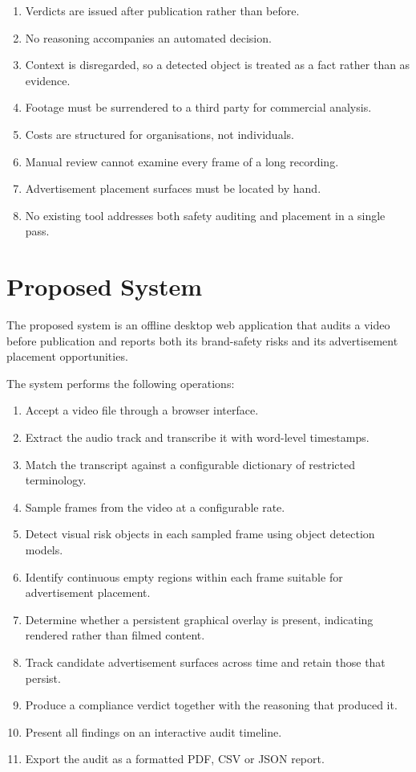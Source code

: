 \documentclass[12pt,a4paper,twoside]{report}
\begin{document}
\begin{enumerate}
\item Verdicts are issued after publication rather than before.
\item No reasoning accompanies an automated decision.
\item Context is disregarded, so a detected object is treated as a fact rather than as evidence.
\item Footage must be surrendered to a third party for commercial analysis.
\item Costs are structured for organisations, not individuals.
\item Manual review cannot examine every frame of a long recording.
\item Advertisement placement surfaces must be located by hand.
\item No existing tool addresses both safety auditing and placement in a single pass.
\end{enumerate}

\section{Proposed System}

The proposed system is an offline desktop web application that audits a video before publication and reports both its brand-safety risks and its advertisement placement opportunities.

The system performs the following operations:

\begin{enumerate}
\item Accept a video file through a browser interface.
\item Extract the audio track and transcribe it with word-level timestamps.
\item Match the transcript against a configurable dictionary of restricted terminology.
\item Sample frames from the video at a configurable rate.
\item Detect visual risk objects in each sampled frame using object detection models.
\item Identify continuous empty regions within each frame suitable for advertisement placement.
\item Determine whether a persistent graphical overlay is present, indicating rendered rather than filmed content.
\item Track candidate advertisement surfaces across time and retain those that persist.
\item Produce a compliance verdict together with the reasoning that produced it.
\item Present all findings on an interactive audit timeline.
\item Export the audit as a formatted PDF, CSV or JSON report.
\end{enumerate}
\end{document}
